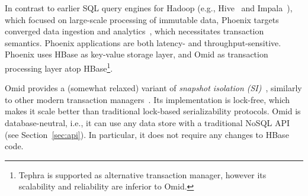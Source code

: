 In contrast to earlier SQL query engines for Hadoop (e.g., 
Hive~\cite{hive} and Impala~\cite{impala}), which focused on large-scale processing
of immutable data, Phoenix targets converged data ingestion and analytics~\cite{PhoenixUseCases},
which necessitates transaction semantics. Phoenix
applications are both latency- and throughput-sensitive. Phoenix uses HBase 
as key-value storage layer, and Omid as transaction processing layer atop HBase\footnote{\small{Tephra 
is supported as alternative transaction manager, however its scalability and reliability are inferior to Omid.}}. 

Omid provides a (somewhat relaxed) variant of \emph{snapshot isolation (SI)}~\cite{DBLP:conf/sigmod/BerensonBGMOO95}, similarly to other modern transaction managers~\cite{Percolator2010,Spanner2012,tephra,cockroach}. Its implementation is lock-free, 
which makes it scale better than traditional lock-based serializability protocols.
Omid is database-neutral, i.e., it  can use any data store with a
traditional NoSQL API (see Section~\ref{sec:api}). 
In particular, it does not require any changes to HBase code.  

